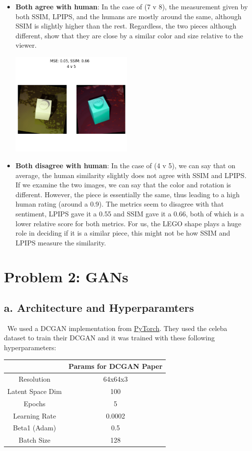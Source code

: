 \documentclass[]{article}
\begin{document}
\begin{itemize}
\begin{center}
    \end{center}
\item
    \textbf{Both agree with human}: In the case of (7 v 8), the measurement given by both SSIM, LPIPS, and the humans are mostly around the same, although SSIM is slightly higher than the rest. Regardless, the two pieces although different, show that they are close by a similar color and size relative to the viewer.\\
    \begin{center}
        \includegraphics[width=6cm]{MLE SSIM/45.png}
    \end{center}
\item
    \textbf{Both disagree with human}: In the case of (4 v 5), we can say that on average, the human similarity slightly does not agree with SSIM and LPIPS. If we examine the two images, we can say that the color and rotation is different. However, the piece is essentially the same, thus leading to a high human rating (around a 0.9). The metrics seem to disagree with that sentiment, LPIPS gave it a 0.55 and SSIM gave it a 0.66, both of which is a lower relative score for both metrics. For us, the LEGO shape plays a huge role in deciding if it is a similar piece, this might not be how SSIM and LPIPS measure the similarity.
\end{itemize}
\clearpage

\section*{Problem 2: GANs}
\subsection*{a. Architecture and Hyperparamters}
\
We used a DCGAN implementation from \href{https://pytorch.org/tutorials/beginner/dcgan_faces_tutorial.html}{PyTorch}.
They used the celeba dataset to train their DCGAN
and it was trained with these following hyperparameters:
\begin{center}
\begin{tabular}{|c|c|}
\hline
& Params for DCGAN Paper \\ \hline
Resolution & 64x64x3 \\ \hline
Latent Space Dim & 100 \\ \hline
Epochs & 5 \\ \hline
Learning Rate & 0.0002 \\ \hline
Beta1 (Adam) & 0.5 \\ \hline
Batch Size & 128 \\ \hline
\end{tabular}
\end{center}
\end{document}
